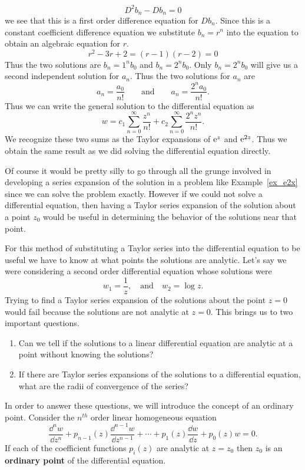 \begin{Example}
  \[
  D^2 b_n - D b_n = 0
  \]
  we see that this is a first order difference equation for $D b_n$.
  Since this is a constant coefficient difference equation we substitute
  $b_n = r^n$ into the equation to obtain an algebraic equation for $r$.
  \[
  r^2 - 3r + 2 = (r-1)(r-2) = 0
  \]
  Thus the two solutions are $b_n = 1^n b_0$ and $b_n = 2^n b_0$.
  Only $b_n = 2^n b_0$
  will give us a second independent solution for $a_n$.  Thus the two solutions
  for $a_n$ are
  \[ 
  a_n = \frac{a_0}{n!} \qquad \mathrm{and} \qquad a_n = \frac{2^n a_0}{n!}.
  \]
  Thus we can write the general solution to the differential equation
  as
  \[ 
  \boxed{
    w = c_1 \sum_{n=0}^\infty \frac{z^n}{n!}
    + c_2 \sum_{n=0}^\infty \frac{2^n z^n}{n!}.
    } 
  \]
  We recognize these two sums as the Taylor expansions of $\mathop{\mathrm{e}}\nolimits^z$ and $\mathop{\mathrm{e}}\nolimits^{2z}$.
  Thus we obtain the same result as we did solving the differential equation directly.
\end{Example}



Of course it would be pretty silly to go through all the grunge involved in
developing a series expansion of the solution
in a problem like
Example~\ref{ex_e2x} since we can solve the problem exactly.
However if we could not solve a differential equation, then having a Taylor
series expansion of the solution about a point $z_0$
would be useful in determining the behavior of the solutions near that point.

For this method of substituting a Taylor series into the differential 
equation to be useful we have to know at what points the solutions are 
analytic.  Let's say we were considering a second order differential 
equation whose solutions were
\[ 
w_1 = \frac{1}{z}, \quad \mathrm{and} \quad w_2 = \log z. 
\]
Trying to find a Taylor series expansion of the solutions about the point
$z = 0$ would fail because the solutions are not analytic at $z=0$.  
This brings us to two important questions.
\begin{enumerate}
\item Can we tell if the solutions to a linear differential equation are 
  analytic at a point without knowing the solutions?
\item If there are Taylor series expansions of the solutions to a differential
  equation, what are the radii of convergence of the series?
\end{enumerate}

In order to answer these questions, we will introduce the concept of an
ordinary point.
Consider the $n^{t h}$ order linear homogeneous equation
\[ 
\frac{\dd^n w}{\dd z^n} + p_{n-1}(z) \frac{\dd^{n-1} w}{\dd z^{n-1}} + \cdots
+ p_1(z) \frac{\dd w}{\dd z} + p_0(z) w  = 0.
\]
If each of the coefficient functions $p_i(z)$ are analytic at $z=z_0$
then $z_0$ is an \textbf{ordinary point} of the differential equation.

